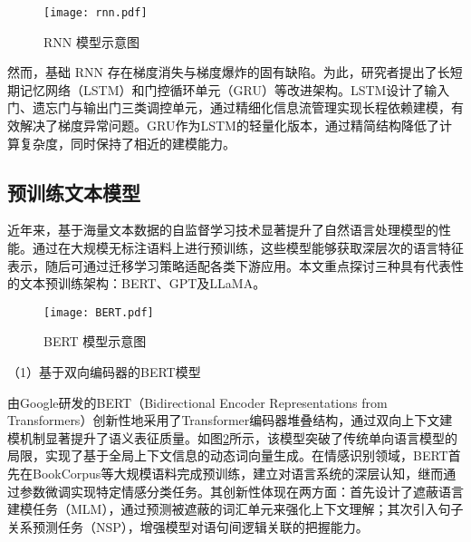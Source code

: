 \begin{figure}[ht]
  \centering
  \texttt{[image: rnn.pdf]}
  \caption{RNN 模型示意图}
  \label{rnn}
\end{figure}


然而，基础 RNN 存在梯度消失与梯度爆炸的固有缺陷。为此，研究者提出了长短期记忆网络（LSTM）和门控循环单元（GRU）等改进架构。LSTM设计了输入门、遗忘门与输出门三类调控单元，通过精细化信息流管理实现长程依赖建模，有效解决了梯度异常问题。GRU作为LSTM的轻量化版本，通过精简结构降低了计算复杂度，同时保持了相近的建模能力。

\subsection{预训练文本模型}


近年来，基于海量文本数据的自监督学习技术显著提升了自然语言处理模型的性能。通过在大规模无标注语料上进行预训练，这些模型能够获取深层次的语言特征表示，随后可通过迁移学习策略适配各类下游应用。本文重点探讨三种具有代表性的文本预训练架构：BERT、GPT及LLaMA。

\begin{figure}[ht]
  \centering
  \texttt{[image: BERT.pdf]}
  \caption{BERT 模型示意图}
  \label{bert}
\end{figure}

（1）基于双向编码器的BERT模型

由Google研发的BERT（Bidirectional Encoder Representations from Transformers）\cite{Devlin_Chang_Lee_Toutanova_2019}创新性地采用了Transformer编码器堆叠结构，通过双向上下文建模机制显著提升了语义表征质量。如图\ref{bert}所示，该模型突破了传统单向语言模型的局限，实现了基于全局上下文信息的动态词向量生成。在情感识别领域，BERT首先在BookCorpus等大规模语料完成预训练，建立对语言系统的深层认知，继而通过参数微调实现特定情感分类任务。其创新性体现在两方面：首先设计了遮蔽语言建模任务（MLM），通过预测被遮蔽的词汇单元来强化上下文理解；其次引入句子关系预测任务（NSP），增强模型对语句间逻辑关联的把握能力。

